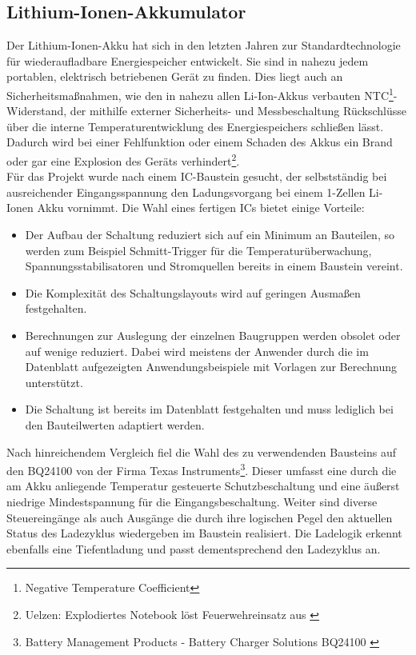\documentclass[12pt]{scrreprt} %
\begin{document}
\subsection{Lithium-Ionen-Akkumulator}
\label{chap:4.2.2}
 Der Lithium-Ionen-Akku hat sich in den letzten Jahren zur Standardtechnologie für wiederaufladbare Energiespeicher entwickelt. Sie sind in nahezu jedem portablen, elektrisch betriebenen Gerät zu finden. Dies liegt auch an Sicherheitsmaßnahmen, wie den in nahezu allen Li-Ion-Akkus verbauten NTC\footnote{Negative Temperature Coefficient}-Widerstand, der mithilfe externer Sicherheits- und Messbeschaltung Rückschlüsse über die interne Temperaturentwicklung des Energiespeichers schließen lässt. Dadurch wird bei einer Fehlfunktion oder einem Schaden des Akkus ein Brand oder gar eine Explosion des Geräts verhindert\footnote{Uelzen: Explodiertes Notebook löst Feuerwehreinsatz aus \citep{TONLINE}}. \\
Für das Projekt wurde nach einem IC-Baustein gesucht, der selbstständig bei ausreichender Eingangsspannung den Ladungsvorgang bei einem 1-Zellen Li-Ionen Akku vornimmt. Die Wahl eines fertigen ICs bietet einige Vorteile:
\begin{itemize}
\item
Der Aufbau der Schaltung reduziert sich auf ein Minimum an Bauteilen, so werden zum Beispiel Schmitt-Trigger für die Temperaturüberwachung, Spannungsstabilisatoren und Stromquellen bereits in einem Baustein vereint. 
\item
Die Komplexität des Schaltungslayouts wird auf geringen Ausmaßen festgehalten.
\item
Berechnungen zur Auslegung der einzelnen Baugruppen werden obsolet oder auf wenige reduziert. Dabei wird meistens der Anwender durch die im Datenblatt aufgezeigten Anwendungsbeispiele mit Vorlagen zur Berechnung unterstützt.
\item
Die Schaltung ist bereits im Datenblatt festgehalten und muss lediglich bei den Bauteilwerten adaptiert werden.
\end{itemize}
Nach hinreichendem Vergleich fiel die Wahl des zu verwendenden Bausteins auf den BQ24100 von der Firma Texas Instruments\footnote{Battery Management Products - Battery Charger Solutions BQ24100 \citep{TIBQ24100}}. Dieser umfasst eine durch die am Akku anliegende Temperatur gesteuerte Schutzbeschaltung und eine äußerst niedrige Mindestspannung für die Eingangsbeschaltung. Weiter sind diverse Steuereingänge als auch Ausgänge die durch ihre logischen Pegel den aktuellen Status des Ladezyklus wiedergeben im Baustein realisiert. Die Ladelogik erkennt ebenfalls eine Tiefentladung und passt dementsprechend den Ladezyklus an. \\
\end{document}
